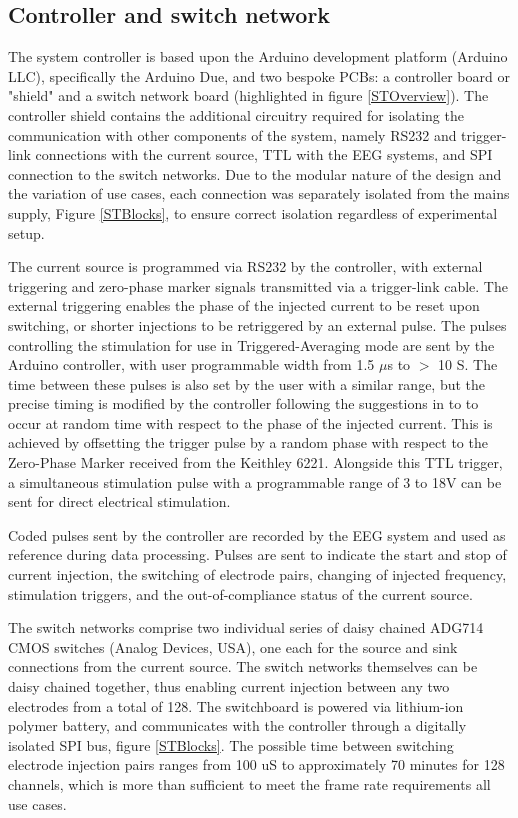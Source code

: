 \subsection{Controller and switch network}

The system controller is based upon the Arduino development platform (Arduino LLC), specifically the Arduino Due, and two bespoke PCBs: a controller board or "shield" and a switch network board (highlighted in figure \ref{STOverview}). The controller shield contains the additional circuitry required for isolating the communication with other components of the system, namely RS232 and trigger-link connections with the current source, TTL with the EEG systems, and SPI connection to the switch networks. Due to the modular nature of the design and the variation of use cases, each connection was separately isolated from the mains supply, Figure \ref{STBlocks}, to ensure correct isolation regardless of experimental setup.

The current source is programmed via RS232 by the controller, with external triggering and zero-phase marker signals transmitted via a trigger-link cable. The external triggering enables the phase of the injected current to be reset upon switching, or shorter injections to be retriggered by an external pulse. The pulses controlling the stimulation for use in Triggered-Averaging mode are sent by the Arduino controller, with user programmable width from 1.5 $\mu$s to $>$ 10 S. The time between these pulses is also set by the user with a similar range, but the precise timing is modified by the controller following the suggestions in \cite{Aristovich_2015} to to occur at random time with respect to the phase of the injected current. This is achieved by offsetting the trigger pulse by a random phase with respect to the Zero-Phase Marker received from the Keithley 6221. Alongside this TTL trigger, a simultaneous stimulation pulse with a programmable range of 3 to 18V can be sent for direct electrical stimulation.

Coded pulses sent by the controller are recorded by the EEG system and used as reference during data processing. Pulses are sent to indicate the start and stop of current injection, the switching of electrode pairs, changing of injected frequency, stimulation triggers, and the out-of-compliance status of the current source. 

The switch networks comprise two individual series of daisy chained ADG714 CMOS switches (Analog Devices, USA), one each for the source and sink connections from the current source. The switch networks themselves can be daisy chained together, thus enabling current injection between any two electrodes from a total of 128. The switchboard is powered via lithium-ion polymer battery, and communicates with the controller through a digitally isolated SPI bus, figure \ref{STBlocks}. The possible time between switching electrode injection pairs ranges from 100 uS to approximately 70 minutes for 128 channels, which is more than sufficient to meet the frame rate requirements all use cases. 